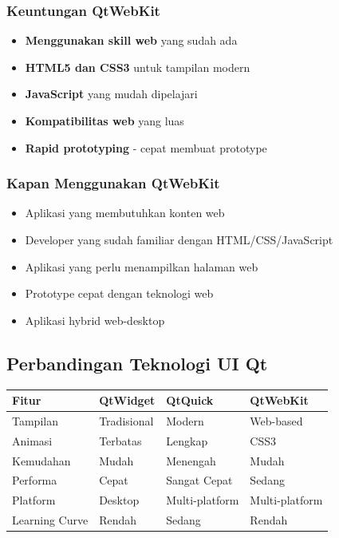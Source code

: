 \subsubsection{Keuntungan QtWebKit}

\begin{itemize}
\item \textbf{Menggunakan skill web} yang sudah ada
\item \textbf{HTML5 dan CSS3} untuk tampilan modern
\item \textbf{JavaScript} yang mudah dipelajari
\item \textbf{Kompatibilitas web} yang luas
\item \textbf{Rapid prototyping} - cepat membuat prototype
\end{itemize}

\subsubsection{Kapan Menggunakan QtWebKit}

\begin{itemize}
\item Aplikasi yang membutuhkan konten web
\item Developer yang sudah familiar dengan HTML/CSS/JavaScript
\item Aplikasi yang perlu menampilkan halaman web
\item Prototype cepat dengan teknologi web
\item Aplikasi hybrid web-desktop
\end{itemize}

\subsection{Perbandingan Teknologi UI Qt}

\begin{center}
\begin{tabular}{|l|l|l|l|}
\hline
\textbf{Fitur} & \textbf{QtWidget} & \textbf{QtQuick} & \textbf{QtWebKit} \\
\hline
Tampilan & Tradisional & Modern & Web-based \\
\hline
Animasi & Terbatas & Lengkap & CSS3 \\
\hline
Kemudahan & Mudah & Menengah & Mudah \\
\hline
Performa & Cepat & Sangat Cepat & Sedang \\
\hline
Platform & Desktop & Multi-platform & Multi-platform \\
\hline
Learning Curve & Rendah & Sedang & Rendah \\
\hline
\end{tabular}
\end{center}

